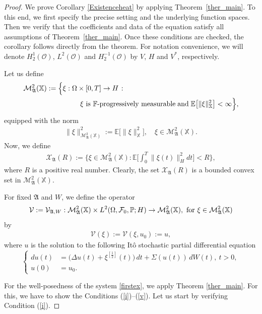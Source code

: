 \documentclass[english,a4paper,11pt]{amsart}
\theoremstyle{plain}
\theoremstyle{definition}
\theoremstyle{remark}
\numberwithin{equation}{section}
\newcommand{\MA}{\mathfrak{A}}
\newcommand{\CO}{{{ \mathcal O }}}
\newcommand{\EE}{ \mathbb{E} }
\newcommand{\Mcal} {{\mathcal M}}
\newcommand{\Vcal} {{\mathcal V}}
\newcommand{\Afrak} {{\mathfrak A}}
\renewcommand{\P}{\mathbb{P}}
\newcommand{\X}{\mathbb{X}}
\begin{document}
\begin{proof} 
 We prove Corollary \ref{Existenceheat} by applying Theorem~\ref{ther_main}. To this end, we first specify the precise setting and the underlying function spaces. Then we verify that the coefficients and data of the equation satisfy all assumptions of Theorem~\ref{ther_main}. Once these conditions are checked, the corollary follows directly from the theorem. For notation convenience, we will denote $H_2^1(\CO)$, $L^2(\CO)$ and $H_2^{-1}(\CO)$ by $V$, $H$ and $V^\ast$, respectively.
 
 Let us  define 
\begin{align*}
	\Mcal_{\Afrak}^{2}(\X):=\Big\{ \xi&:\Omega\times[0,T]\to H\;\colon\;\\
	&\qquad\text{\ensuremath{\xi} is \ensuremath{\mathbb{F}}-progressively measurable}\;\text{and}\;\EE\big[\|\xi\|_{\X}^{2}\big]<\infty\Big\},
\end{align*}equipped with  the norm 
\begin{align*}
	\|\xi\|_{\Mcal_{\Afrak}^{2}(\X)}^2:=\EE\big[\|\xi\|_{\X}^2\big], \quad \xi \in \Mcal_{\Afrak}^{2}(\X).
\end{align*}
Now, we define 
\begin{align*}
	\mathcal{X}_\MA(R) :=\bigg\{\xi \in \Mcal_{\Afrak}^{2}(\X): \EE\bigg[\int_0^T \|\xi(t)\|_H^2d t\bigg]<R \bigg\}, 
\end{align*}where $R$ is a positive real number. Clearly, the set $ \mathcal{X}_\MA(R) $ is a bounded convex set in $\Mcal_{\Afrak}^{2}(\X)$.


For fixed $\MA$ and $W$, we define the operator $$\Vcal:=\Vcal_{\MA,W}:\Mcal_{\Afrak}^2(\X) \times L^2(\Omega,\mathcal{F}_0,\P;H)\break\to \Mcal_{\Afrak}^2(\X), \text{ for }\xi\in \Mcal_{\Afrak}^2(\X)
$$
  by
\begin{align*}
	\Vcal(\xi):=\Vcal(\xi,u_0):=u,
\end{align*}where $u$ is the solution to the following It\^o stochastic partial differential equation
\begin{equation}\label{TS1}
	\left\{
	\begin{aligned}
		d u(t)&= \big(\Delta u(t)+\xi^{[\frac{1}{2}]}(t)\big)\, d t+\Sigma (u(t))\, dW(t), \ t>0, \\
		u(0)&=u_0.
	\end{aligned}
	\right.
\end{equation}
%


For the well-posedness of the system \eqref{firstex}, we apply Theorem \ref{ther_main}. For this, we have to show the Conditions (\ref{i})--(\ref{v}). Let us start by verifying Condition (\ref{i}).


\end{proof}
\end{document}
